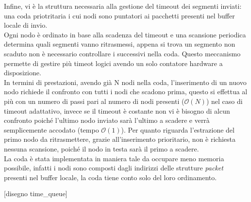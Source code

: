 Infine, vi è la struttura necessaria alla gestione del timeout dei segmenti
inviati: una coda priotritaria i cui nodi sono puntatori
ai pacchetti presenti nel buffer locale di invio.\\
Ogni nodo è ordinato in base alla scadenza del timeout e una scansione 
periodica determina quali segmenti vanno ritrasmessi, appena si trova un 
segmento non scaduto non è necessario controllare i successivi
nella coda.
Questo meccanismo permette di gestire più timeot logici avendo un solo 
contatore hardware a disposizione.\\
In termini di prestazioni, avendo già N nodi nella coda, 
l'inserimento di un nuovo nodo richiede il confronto con tutti i
nodi che scadono prima, questo si effettua al più con un numero di passi
pari al numero di nodi presenti ($\mathcal{O}(N)$)
nel caso di timeout adattativo, invece se il timeout è costante non vi è bisogno
di alcun confronto poiché l'ultimo nodo inviato sarà l'ultimo a scadere e 
verrà semplicemente accodato (tempo $\mathcal{O}(1)$).
Per quanto riguarda l'estrazione del primo nodo da ritrasmettere, grazie 
all'inserimento prioritario, non è richiesta nessuna scansione, poiché il nodo 
in testa sarà il primo a scadere.\\
La coda è stata implementata in maniera tale da occupare meno memoria possibile,
infatti i nodi sono composti dagli indirizzi delle strutture \emph{packet}
presenti nel buffer locale, la coda tiene conto solo del loro ordinamento.

[disegno time\_queue]


